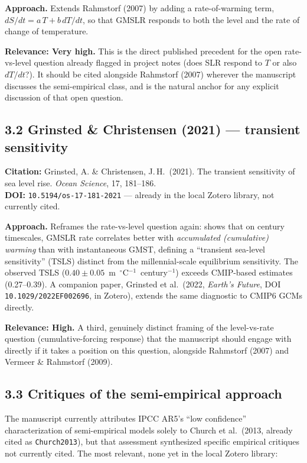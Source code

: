 \documentclass[11pt]{article}
\begin{document}
\noindent\textbf{Approach.} Extends Rahmstorf (2007) by adding a rate-of-warming
term, $dS/dt = a\,T + b\,dT/dt$, so that GMSLR responds to both the level and
the rate of change of temperature.

\noindent\textbf{Relevance: Very high.} This is the direct published
precedent for the open rate-vs-level question already flagged in project
notes (does SLR respond to $T$ or also $dT/dt$?). It should be cited
alongside Rahmstorf (2007) wherever the manuscript discusses the
semi-empirical class, and is the natural anchor for any explicit discussion
of that open question.

\subsection*{3.2 Grinsted \& Christensen (2021) --- transient sensitivity}

\noindent\textbf{Citation:} Grinsted, A. \& Christensen, J.\,H.\ (2021). The
transient sensitivity of sea level rise. \textit{Ocean Science}, 17,
181--186.\\
\textbf{DOI:} \texttt{10.5194/os-17-181-2021} --- already in the local
Zotero library, not currently cited.

\noindent\textbf{Approach.} Reframes the rate-vs-level question again: shows
that on century timescales, GMSLR rate correlates better with
\emph{accumulated (cumulative) warming} than with instantaneous GMST,
defining a ``transient sea-level sensitivity'' (TSLS) distinct from the
millennial-scale equilibrium sensitivity. The observed TSLS
($0.40 \pm 0.05$~m~$^\circ$C$^{-1}$~century$^{-1}$) exceeds CMIP-based
estimates (0.27--0.39). A companion paper, Grinsted et al.\ (2022,
\textit{Earth's Future}, DOI \texttt{10.1029/2022EF002696}, in Zotero),
extends the same diagnostic to CMIP6 GCMs directly.

\noindent\textbf{Relevance: High.} A third, genuinely distinct framing of
the level-vs-rate question (cumulative-forcing response) that the manuscript
should engage with directly if it takes a position on this question,
alongside Rahmstorf (2007) and Vermeer \& Rahmstorf (2009).

\subsection*{3.3 Critiques of the semi-empirical approach}

The manuscript currently attributes IPCC AR5's ``low confidence''
characterization of semi-empirical models solely to Church et al.\ (2013,
already cited as \texttt{Church2013}), but that assessment synthesized
specific empirical critiques not currently cited.
The most relevant, none yet in the local Zotero library:
\end{document}
